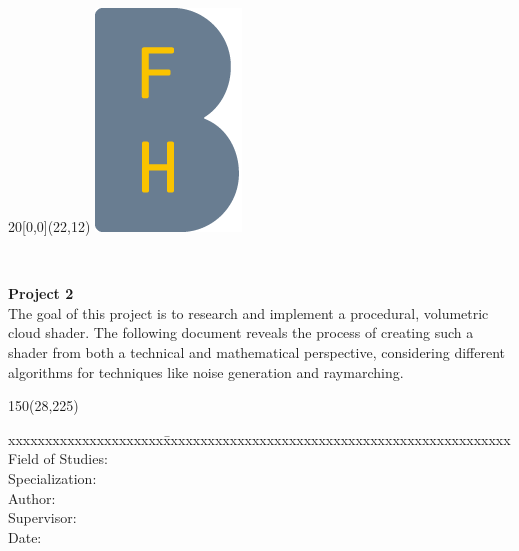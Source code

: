 
\begin{titlepage}

\setlength{\unitlength}{1mm}

\begin{textblock}{20}[0,0](22,12)
    \includegraphics[scale=1.0]{../img/BFH_Logo_B.png}
\end{textblock}

\begin{flushleft}

\vspace*{21mm}

\fontsize{26pt}{40pt}\selectfont
\textbf{\doctitle}	\\
\vspace{2mm}

\fontsize{16pt}{24pt}\selectfont\vspace{0.3em}
\docsubtitle
\vspace{5mm}

\fontsize{10pt}{12pt}\selectfont
\textbf{Project 2} \\

\fontsize{10pt}{12pt}\selectfont
The goal of this project is to research and implement a procedural, volumetric cloud shader. The following document reveals the process of creating such a shader from both a technical and mathematical perspective, considering different algorithms for techniques like noise generation and raymarching.
\begin{textblock}{150}(28,225)
\fontsize{10pt}{17pt}
\begin{tabbing}
xxxxxxxxxxxxxxxxxxxxx\=xxxxxxxxxxxxxxxxxxxxxxxxxxxxxxxxxxxxxxxxxxxxxxx \kill
Field of Studies:	\> \fieldofstudies	\\
Specialization:	    \> \specialisation	\\
Author:		        \> \docauthor \\
Supervisor:         \> \prof \\
Date:			    \> \versiondate \\
\end{tabbing}


\end{textblock}
\end{flushleft}
\end{titlepage}
